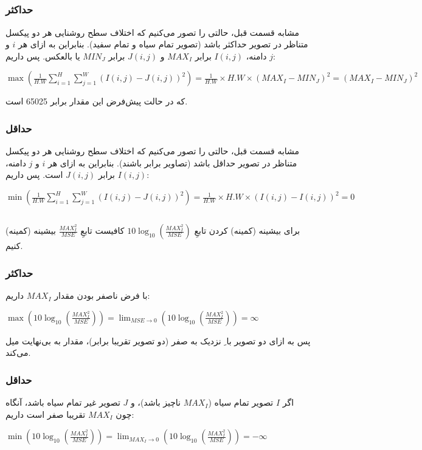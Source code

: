 \documentclass{article}
\begin{document}
\subsection{}
\subsubsection{حداکثر}
مشابه قسمت قبل، حالتی را تصور می‌کنیم که اختلاف سطح روشنایی هر دو پیکسل متناظر در تصویر حداکثر باشد (تصویر تمام سیاه و تمام سفید). بنابراین به ازای هر $i$ و $j$ دامنه، $I(i, j)$ برابر $MAX_{I}$ و $J(i, j)$ برابر $MIN_{J}$ یا بالعکس. پس داریم:
\newline
\begin{latin}
$
\max(\frac{1}{H.W}\sum_{i=1}^{H}\sum_{j=1}^{W} (I(i, j) - J(i, j))^{2})=\frac{1}{H.W}\times H.W\times (MAX_{I} - MIN_{J})^{2}=(MAX_{I} - MIN_{J})^{2}
$
\end{latin}
که در حالت پیش‌فرض این مقدار برابر 65025 است.
\subsubsection{حداقل}
مشابه قسمت قبل، حالتی را تصور می‌کنیم که اختلاف سطح روشنایی هر دو پیکسل متناظر در تصویر حداقل باشد (تصاویر برابر باشند). بنابراین به ازای هر $i$ و $j$ دامنه، $I(i, j)$ برابر $J(i, j)$ است. پس داریم:
\newline
\begin{latin}
$
\min(\frac{1}{H.W}\sum_{i=1}^{H}\sum_{j=1}^{W} (I(i, j) - J(i, j))^{2})=\frac{1}{H.W}\times H.W\times (I(i, j) - I(i, j))^{2}=0
$
\end{latin}


\subsection{}
برای بیشینه (کمینه) کردن تابعِ 
$
10\log_{10}(\frac{MAX_{I}^{2}}{MSE})
$
کافیست تابعِ
$
\frac{MAX_{I}^{2}}{MSE}
$
بیشینه (کمینه) کنیم.
\subsubsection{حداکثر}
با فرض ناصفر بودن مقدار $MAX_{I}$ داریم:
\newline
\begin{latin}
$
\max(10\log_{10}(\frac{MAX_{I}^{2}}{MSE}))=\lim_{MSE \to 0 } (10\log_{10}(\frac{MAX_{I}^{2}}{MSE}))=\infty
$
\end{latin}
پس به ازای دو تصویر با ِ نزدیک به صفر (دو تصویر تقریبا برابر)، مقدار  به بی‌نهایت میل می‌کند.
\subsubsection{حداقل}
اگر $I$ تصویر تمام سیاه ($MAX_{I}$ ناچیز باشد)، و $J$ تصویر غیر تمام سیاه باشد، آنگاه چون
$MAX_{I}$
تقریبا صفر است داریم:
\newline
\begin{latin}
$
\min(10\log_{10}(\frac{MAX_{I}^{2}}{MSE}))=\lim_{MAX_{I} \to 0 } (10\log_{10}(\frac{MAX_{I}^{2}}{MSE}))=-\infty
$
\end{latin}
\end{document}
